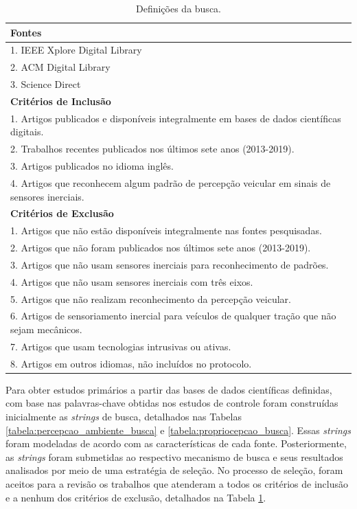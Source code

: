 \begin{table}[h!]
    \small
    \centering
    \caption{Definições da busca.}
    \label{tabela:definicao_pesquisa}
    \begin{tabular}{l}
        \toprule
        \textbf{Fontes} \\
        \toprule
        1. IEEE Xplore Digital Library \\
        2. ACM Digital Library \\
        3. Science Direct \\
        \toprule
        \textbf{Critérios de Inclusão}\\
        \toprule
        1. Artigos publicados e disponíveis integralmente em bases de dados científicas digitais.\\
        2. Trabalhos recentes publicados nos últimos sete anos (2013-2019).\\ 
        3. Artigos publicados no idioma inglês.\\
        4. Artigos que reconhecem algum padrão de percepção veicular em sinais de sensores inerciais.\\
        \toprule
        \textbf{Critérios de Exclusão}\\
        \toprule
        1. Artigos que não estão disponíveis integralmente nas fontes pesquisadas.\\
        2. Artigos que não foram publicados nos últimos sete anos (2013-2019).\\
        3. Artigos que não usam sensores inerciais para reconhecimento de padrões.\\
        4. Artigos que não usam sensores inerciais com três eixos.\\
        5. Artigos que não realizam reconhecimento da percepção veicular. \\
        6. Artigos de sensoriamento inercial para veículos de qualquer tração que não sejam mecânicos. \\
        7. Artigos que usam tecnologias intrusivas ou ativas.\\
        8. Artigos em outros idiomas, não incluídos no protocolo.\\
        \bottomrule
    \end{tabular}
\end{table}

Para obter estudos primários a partir das bases de dados científicas definidas, com base nas palavras-chave obtidas nos estudos de controle foram construídas inicialmente as \textit{strings} de busca, detalhados nas Tabelas \ref{tabela:percepcao_ambiente_busca} e \ref{tabela:propriocepcao_busca}. Essas \textit{strings} foram modeladas de acordo com as características de cada fonte. Posteriormente, as \textit{strings} foram submetidas ao respectivo mecanismo de busca e seus resultados analisados por meio de uma estratégia de seleção. No processo de seleção, foram aceitos para a revisão os trabalhos que atenderam a todos os critérios de inclusão e a nenhum dos critérios de exclusão, detalhados na Tabela \ref{tabela:definicao_pesquisa}.

